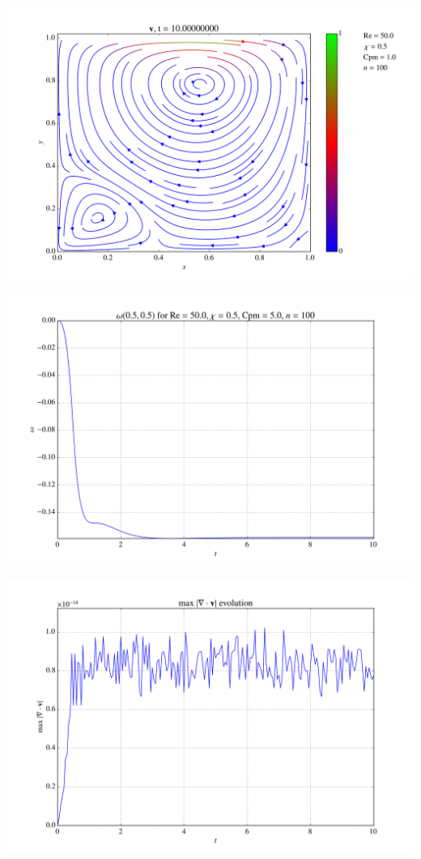 \documentclass[portrait,a0paper,fontscale=0.40]{baposter} %
\begin{document}
\begin{poster}
{\begin{multicols}{2}
\begin{center}
\includegraphics[width=0.67\linewidth]{simulations/Re50Cpm1.png}
\end{center}

\begin{center}
\includegraphics[width=0.6\linewidth]{simulations/vortRe50N100Chi05Cpm5T10fps20.png}
\end{center}

\begin{center}
\includegraphics[width=0.6\linewidth]{simulations/divVRe50N100Chi05Cpm5T10fps20.png}
\end{center}


\end{multicols}}
\end{poster}
\end{document}
